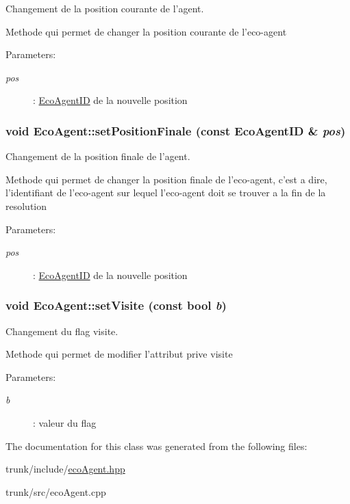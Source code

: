 Changement de la position courante de l'agent. 

Methode qui permet de changer la position courante de l'eco-agent

\begin{Desc}
\item[Parameters:]
\begin{description}
\item[{\em pos}]: \hyperlink{classEcoAgentID}{EcoAgentID} de la nouvelle position \end{description}
\end{Desc}
\hypertarget{classEcoAgent_a0ffbb1fdb23fb5d8ad188e8f16d8c50}{
\subsubsection[{setPositionFinale}]{\setlength{\rightskip}{0pt plus 5cm}void EcoAgent::setPositionFinale (const {\bf EcoAgentID} \& {\em pos})}}
\label{classEcoAgent_a0ffbb1fdb23fb5d8ad188e8f16d8c50}


Changement de la position finale de l'agent. 

Methode qui permet de changer la position finale de l'eco-agent, c'est a dire, l'identifiant de l'eco-agent sur lequel l'eco-agent doit se trouver a la fin de la resolution

\begin{Desc}
\item[Parameters:]
\begin{description}
\item[{\em pos}]: \hyperlink{classEcoAgentID}{EcoAgentID} de la nouvelle position \end{description}
\end{Desc}
\hypertarget{classEcoAgent_aa8d25798a3783276c07725bce711120}{
\subsubsection[{setVisite}]{\setlength{\rightskip}{0pt plus 5cm}void EcoAgent::setVisite (const bool {\em b})}}
\label{classEcoAgent_aa8d25798a3783276c07725bce711120}


Changement du flag visite. 

Methode qui permet de modifier l'attribut prive visite

\begin{Desc}
\item[Parameters:]
\begin{description}
\item[{\em b}]: valeur du flag \end{description}
\end{Desc}


The documentation for this class was generated from the following files:\begin{CompactItemize}
\item 
trunk/include/\hyperlink{ecoAgent_8hpp}{ecoAgent.hpp}\item 
trunk/src/ecoAgent.cpp\end{CompactItemize}
